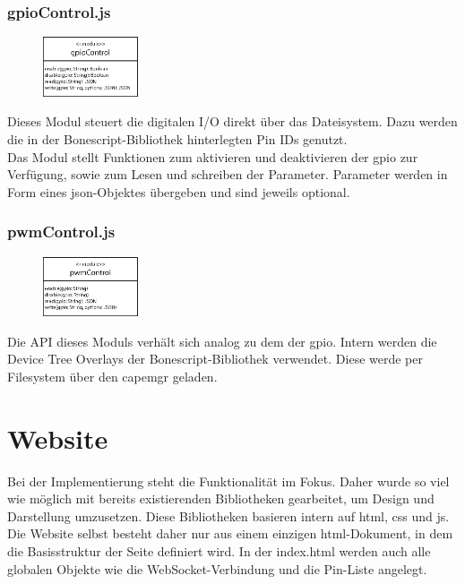 \subsubsection{gpioControl.js}
\begin{figure}
  \vspace{-16pt}
  \centering
  \includegraphics[width = 0.25\textwidth]{documentation/images/apiGPIOControl.eps}
\end{figure}

Dieses Modul steuert die digitalen I/O direkt über das Dateisystem. Dazu werden die in der Bonescript-Bibliothek hinterlegten Pin IDs genutzt.\\

Das Modul stellt Funktionen zum aktivieren und deaktivieren der \gls{gpio} zur Verfügung, sowie zum Lesen und schreiben der Parameter. Parameter werden in Form eines \gls{json}-Objektes übergeben und sind jeweils optional.

\subsubsection{pwmControl.js}
\begin{figure}
  \vspace{-16pt}
  \centering
  \includegraphics[width = 0.25\textwidth]{documentation/images/apiPWMControl.eps}
\end{figure}

Die API dieses Moduls verhält sich analog zu dem der \gls{gpio}. Intern werden die Device Tree Overlays der Bonescript-Bibliothek verwendet. Diese werde per Filesystem über den \gls{capemgr} geladen.

\section{Website} Bei der Implementierung steht die Funktionalität im Fokus. Daher wurde so viel wie möglich mit bereits existierenden Bibliotheken gearbeitet, um Design und Darstellung umzusetzen. Diese Bibliotheken basieren intern auf \gls{html}, \gls{css} und \gls{js}.\\
Die Website selbst besteht daher nur aus einem einzigen \gls{html}-Dokument, in dem die Basisstruktur der Seite definiert wird. In der index.html werden auch alle globalen Objekte wie die WebSocket-Verbindung und die Pin-Liste angelegt.\\

